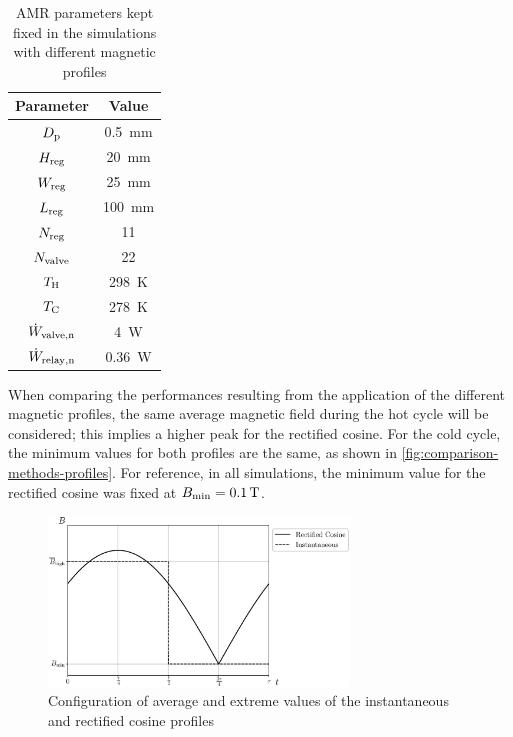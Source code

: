 \documentclass[referee]{svjour3}
\newcommand{\wvalven}{\w\ped{valve,n}}
\newcommand{\wrelayn}{\w\ped{relay,n}}
\begin{document}
\begin{table}[!ht]
  \centering
  \caption{AMR parameters kept fixed in the simulations with different magnetic profiles}
  \begin{tabular}{c|c}
\hline
\textbf{Parameter} & \textbf{Value}\\
\hline
   $D_{\mathrm{p}}$ & \SI{0.5}{\mm}\\
$H_{\mathrm{reg}}$ & \SI{20}{\mm}\\
$W_{\mathrm{reg}}$ & \SI{25}{\mm}\\
$L_{\mathrm{reg}}$ & \SI{100}{\mm}\\
$N_{\mathrm{reg}}$ & 11 \\
$N_{\mathrm{valve}}$ & 22 \\
$T_{\mathrm{H}}$ & \SI{298}{\kelvin}\\
$T_{\mathrm{C}}$ & \SI{278}{\kelvin}\\
$\wvalven$ & \SI{4}{\watt}\\
$\wrelayn$ & \SI{0.36}{\watt}\\
\hline
  \end{tabular}

  \label{tab:params-cobem}
\end{table}



When comparing the performances resulting from the application of the different magnetic profiles, the same average magnetic field during the hot cycle will be considered; this implies a higher peak for the rectified cosine. For the cold cycle, the minimum values for both profiles are the same, as shown in \autoref{fig:comparison-methods-profiles}. For reference, in all simulations,  the minimum value for the rectified cosine was fixed at ${B}_{\mathrm{min}} = \SI{0.1}{\tesla}$. 

\begin{figure}[!ht]
  \centering
\includegraphics[width=8cm]{Fig5-profiles_it_and_rc_same_minimum}
  \caption{Configuration of average and extreme values of the instantaneous and rectified cosine profiles }
  \label{fig:comparison-methods-profiles}
\end{figure}
\end{document}
